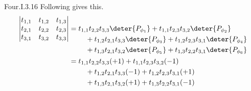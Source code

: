 \begin{ans}{Four.I.3.16}
        Following  gives this.
          \begin{align*}
             \begin{vmatrix}
                t_{1,1}  &t_{1,2}  &t_{1,3}  \\
                t_{2,1}  &t_{2,2}  &t_{2,3}  \\
                t_{3,1}  &t_{3,2}  &t_{3,3}
             \end{vmatrix}
             &=\begin{aligned}[t]
                 &t_{1,1}t_{2,2}t_{3,3}\deter{P_{\phi_1}}
                   +t_{1,1}t_{2,3}t_{3,2}\deter{P_{\phi_2}} \\
                 &\hbox{}\quad\hbox{}
                  +t_{1,2}t_{2,1}t_{3,3}\deter{P_{\phi_3}}
                             +t_{1,2}t_{2,3}t_{3,1}\deter{P_{\phi_4}} \\
                 &\hbox{}\quad\hbox{}
                  +t_{1,3}t_{2,1}t_{3,2}\deter{P_{\phi_5}}
                             +t_{1,3}t_{2,2}t_{3,1}\deter{P_{\phi_6}}
               \end{aligned}                                               \\
             &=\begin{aligned}[t]
                 & t_{1,1}t_{2,2}t_{3,3}(+1)
                   +t_{1,1}t_{2,3}t_{3,2}(-1)  \\
                 &\hbox{}\quad\hbox{}
                   +t_{1,2}t_{2,1}t_{3,3}(-1)
                    +t_{1,2}t_{2,3}t_{3,1}(+1) \\
                 &\hbox{}\quad\hbox{}
                   +t_{1,3}t_{2,1}t_{3,2}(+1)
                         +t_{1,3}t_{2,2}t_{3,1}(-1)
               \end{aligned}
          \end{align*}
     
\end{ans}
